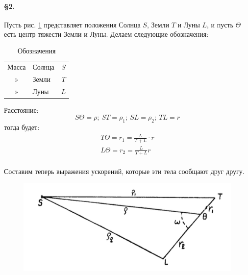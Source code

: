 \documentclass[a4paper,12pt]{article}
\begin{document}
\paragraph{\S2.} 

Пусть рис. \ref{fig:21} представляет положения Солнца $S$, Земли $T$ и Луны $L$, и пусть $\Theta$ есть центр тяжести Земли и Луны. Делаем следующие обозначения:

\begin{table}[H]
	\centering
	\caption{Обозначения}
\begin{tabular}{clc} 
Масса & Солнца & $S$\\
»& Земли & $T$\\
»& Луны & $L$\\
\end{tabular}
\end{table}

Расстояние:
\[
  S\Theta=\rho;\ 
  ST=\rho_1;\ 
  SL=\rho_2;\ 
  TL=r
\]
тогда будет:
\begin{equation}
\label{eq1}
\begin{aligned}
T\Theta=r_1=
\frac L{T+L}\cdot r \\%
L\Theta=r_2=
\frac L{T+L} r \\
\end{aligned}
\end{equation}

Составим теперь выражения ускорений, которые эти тела сообщают друг другу.

\begin{figure}[H]	 
	\centering
	\includegraphics{21.png}
	\caption{}
	\label{fig:21}
\end{figure}
\end{document}
